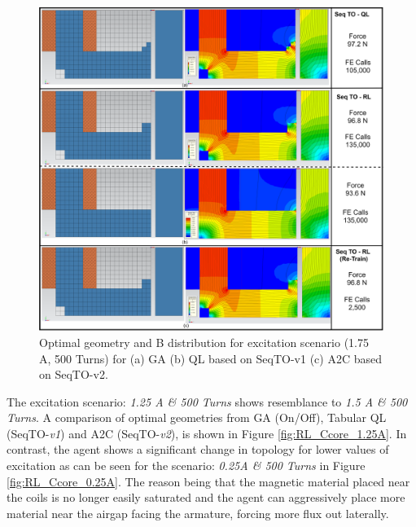 \begin{figure}[h!]
    \centering
    \includegraphics[width=\textwidth]{Figures/Ch_RL/Ccore_1.75A.png}
    \caption{Optimal geometry and B distribution for excitation scenario (1.75 A, 500 Turns) for (a) GA (b) QL based on SeqTO-v1 (c) A2C based on SeqTO-v2.}
    \label{fig:RL_Ccore_1.75A}
\end{figure}

The excitation scenario: \textit{1.25 A \& 500 Turns} shows resemblance to \textit{1.5 A \& 500 Turns}.  A comparison of optimal geometries from GA (On/Off), Tabular QL (SeqTO-\textit{v1}) and A2C (SeqTO-\textit{v2}), is shown in Figure \ref{fig:RL_Ccore_1.25A}. In contrast, the agent shows a significant change in topology for lower values of excitation as can be seen for the scenario: \textit{0.25A \& 500 Turns} in Figure \ref{fig:RL_Ccore_0.25A}. The reason being that the magnetic material placed near the coils is no longer easily saturated and the agent can aggressively place more material near the airgap facing the armature, forcing more flux out laterally.

